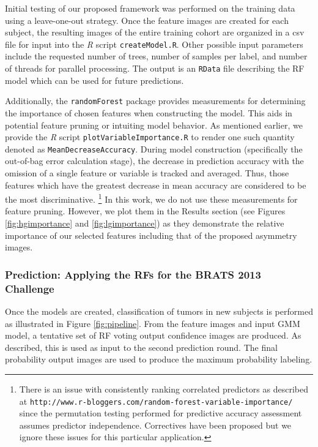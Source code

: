 \documentclass[preprint,authoryear,review,12pt]{elsarticle}
\begin{document}
Initial testing of our proposed framework was performed 
on the training data using a leave-one-out strategy.  Once the
feature images are created for each subject, the resulting images of the entire
training cohort are organized in a csv file for input into the \textit{R} script
{\tt createModel.R}.  Other possible input parameters include the requested 
number of trees, number of samples per label, and number of threads for parallel
processing.  The output is an {\tt RData} file describing the RF
model which can be used for future predictions.
 
Additionally, the {\tt randomForest} package provides  measurements 
for determining the importance of chosen features when constructing the model.  
This aids in potential feature pruning or intuiting model behavior.  As mentioned
earlier, we provide the \textit{R} script {\tt plotVariableImportance.R} to render
one such quantity denoted as {\tt MeanDecreaseAccuracy}.  During model construction
(specifically the out-of-bag error calculation stage), the decrease in prediction accuracy
with the omission of a single feature or variable is tracked and averaged.  Thus,
those features which have the greatest decrease in mean accuracy are considered
to be the most discriminative.%
\footnote{
There is an issue with consistently ranking correlated predictors as described at {\tt http://www.r-bloggers.com/random-forest-variable-importance/} since the permutation testing performed for predictive accuracy assessment assumes predictor independence.  Correctives have been proposed but we ignore these issues for this particular application.
}
In this work, we do not use these measurements for feature pruning.  However,
we plot them in the Results section (see Figures \ref{fig:hgimportance} and
\ref{fig:lgimportance}) as they demonstrate the relative importance of our
selected features including that of the proposed asymmetry images.

\subsubsection{Prediction:  Applying the RFs for the BRATS 2013 Challenge}

Once the models are created, classification of tumors in new subjects is performed
as illustrated in Figure \ref{fig:pipeline}.  From the feature images and input 
GMM model, a tentative set of RF voting output confidence images are produced.
As described, this is used as input to the second prediction round.  The 
final probability output images are used to produce the maximum probability labeling.  
\end{document}
